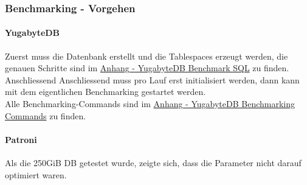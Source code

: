 
\begin{flushleft}
    \subsubsection{Benchmarking - Vorgehen}
    \paragraph{YugabyteDB}
    Zuerst muss die Datenbank erstellt und die Tablespaces erzeugt werden, die genauen Schritte sind im \hyperref[subsubsec:yugabytedb_benchmarking_sql]{Anhang - YugabyteDB Benchmark SQL} zu finden.\\    Anschliessend
    Anschliessend muss pro Lauf erst initialisiert werden, dann kann mit dem eigentlichen Benchmarking gestartet werden.\\
    Alle Benchmarking-Commands sind im \hyperref[subsec:yugabytedb_benchmarking_commands]{Anhang - YugabyteDB Benchmarking Commands} zu finden.
    \paragraph{Patroni}
    Als die 250GiB DB getestet wurde, zeigte sich, dass die Parameter nicht darauf optimiert waren.


\end{flushleft}
